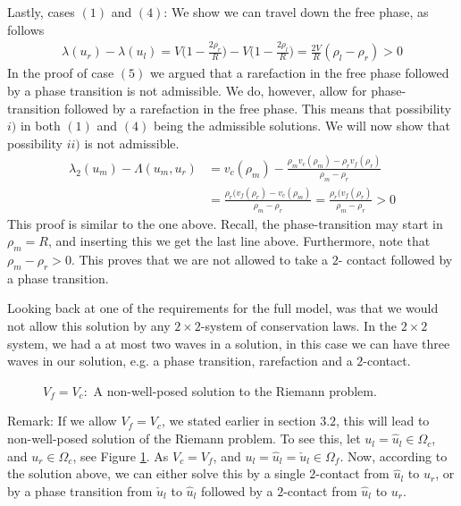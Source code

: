 \documentclass[10pt]{article}
\numberwithin{equation}{section}
\begin{document}
Lastly, cases $(1)$ and $(4)$: \newline
We show we can travel down the free phase, as follows
\begin{align*}
    \lambda(u_r) - \lambda(u_l) = V\bigg( 1- \frac{2\rho_{r}}{R}\bigg) - V\bigg( 1- \frac{2\rho_{l}}{R}\bigg) = \frac{2V}{R}( \rho_l - \rho_r) > 0
\end{align*}
In the proof of case $(5)$ we argued that a rarefaction in the free phase followed by a phase transition is not admissible. We do, however, allow for phase-transition followed by a rarefaction in the free phase. This means that possibility $i)$ in both $(1)$ and $(4)$ being the admissible solutions. We will now show that possibility $ii)$ is not admissible. 
\begin{align*}
    \lambda_2(u_m) - \Lambda(u_m, u_r) &= v_c(\rho_m) - \frac{\rho_m v_c(\rho_m) - \rho_r v_f(\rho_r)}{\rho_m - \rho_r} \\
    &= \frac{\rho_r( v_f(\rho_r) - v_c(\rho_m)}{\rho_m - \rho_r} = \frac{\rho_r( v_f(\rho_r)}{\rho_m - \rho_r} > 0 
\end{align*}
This proof is similar to the one above. Recall, the phase-transition may start in $\rho_m = R$, and inserting this we get the last line above. Furthermore, note that $\rho_m - \rho_r > 0$. This proves that we are not allowed to take a $2$- contact followed by a phase transition. 

Looking back at one of the requirements for the full model, was that we would not allow this solution by any $2 \times 2$-system of conservation laws. In the $2 \times 2$ system, we had a at most two waves in a solution, in this case we can have three waves in our solution, e.g. a phase transition, rarefaction and a $2$-contact. 
\begin{figure}
   
   \caption{$V_f = V_c:$ A non-well-posed solution to the Riemann problem.}
   \label{Fig:NotWellPosed}
\end{figure}
Remark: If we allow $V_f = V_c$, we stated earlier in section $3.2$, this will lead to non-well-posed solution of the Riemann problem. To see this, let $u_l = \hat u_l \in \Omega_c$, and $u_r \in \Omega_c$, see Figure \ref{Fig:NotWellPosed}. As $V_c = V_f$, and  $u_l = \hat u_l = \check u_l \in \Omega_f$. Now, according to the solution above, we can either solve this by a single $2$-contact from $\hat u_l$ to $u_r$, or by a phase transition from $\check u_l$ to $\hat u_l$ followed by a $2$-contact from $\hat u_l$ to $u_r$.
\end{document}
